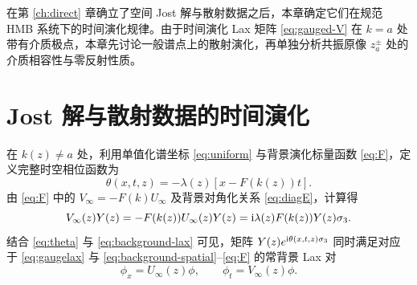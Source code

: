 
在第 \ref{ch:direct} 章确立了空间 Jost 解与散射数据之后，本章确定它们在规范 HMB 系统下的时间演化规律。由于时间演化 Lax 矩阵 \eqref{eq:gauged-V} 在 $k=a$ 处带有介质极点，本章先讨论一般谱点上的散射演化，再单独分析共振原像 $z_a^\pm$ 处的介质相容性与零反射性质。

\section{Jost 解与散射数据的时间演化}

在 $k(z)\ne a$ 处，利用单值化谱坐标 \eqref{eq:uniform} 与背景演化标量函数 \eqref{eq:F}，定义完整时空相位函数为
\begin{equation}\label{eq:theta}
\theta(x,t,z)=-\lambda(z)[x-F(k(z))t].
\end{equation}
由 \eqref{eq:F} 中的 $V_\infty=-F(k)U_\infty$ 及背景对角化关系 \eqref{eq:diagE}，计算得
\begin{equation*}
V_\infty(z)Y(z)=-F(k(z))U_\infty(z)Y(z)=\mathrm{i}\lambda(z)F(k(z))Y(z)\sigma_3.
\end{equation*}
结合 \eqref{eq:theta} 与 \eqref{eq:background-lax} 可见，矩阵 $Y(z)e^{\mathrm{i}\theta(x,t,z)\sigma_3}$ 同时满足对应于 \eqref{eq:gaugelax} 与 \eqref{eq:background-spatial}--\eqref{eq:F} 的常背景 Lax 对
\begin{equation*}
\phi_x=U_\infty(z)\phi,\qquad \phi_t=V_\infty(z)\phi.
\end{equation*}

